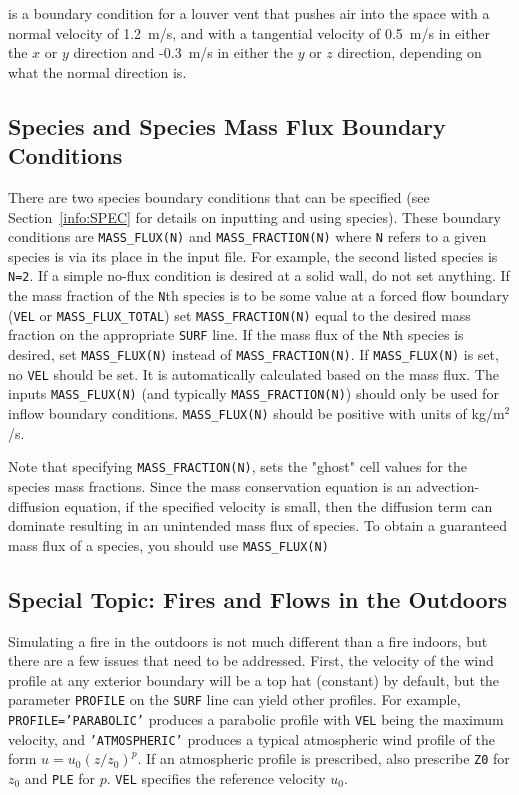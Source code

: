 \documentclass[11pt]{book}
\newcommand{\ct}{\tt\small}
\begin{document}
\noindent
is a boundary condition for a louver vent that pushes air into the
space with a normal velocity of 1.2~m/s, and with a tangential velocity
of 0.5~m/s in either the $x$ or $y$ direction and -0.3~m/s in either
the $y$ or $z$ direction, depending on what the normal direction is.

\subsection{Species and Species Mass Flux Boundary Conditions}

There are two species boundary conditions that can be specified
(see Section~\ref{info:SPEC} for details on inputting and using species).
These boundary conditions are {\ct MASS\_FLUX(N)} and {\ct MASS\_FRACTION(N)}
where {\ct N} refers to a given species is via its place in the
input file. For example, the second listed species is {\ct N=2}.
If a simple no-flux condition is desired at a solid wall, do not set
anything. If the mass fraction of the {\ct N}th species is to be some
value at a forced flow boundary ({\ct VEL} or {\ct MASS\_FLUX\_TOTAL}) set
{\ct MASS\_FRACTION(N)} equal to the desired mass fraction on the appropriate
{\ct SURF} line.
If the mass flux of the {\ct N}th species is desired, set
{\ct MASS\_FLUX(N)} instead of {\ct MASS\_FRACTION(N)}.
If {\ct MASS\_FLUX(N)}
is set, no {\ct VEL} should be set. It is automatically
calculated based on the mass flux.
The inputs {\ct MASS\_FLUX(N)} (and typically {\ct MASS\_FRACTION(N)}) should only be used
for inflow boundary conditions.  {\ct MASS\_FLUX(N)} should be positive with
units of kg/m$^2$/s.

\begin{warning}
\noindent
Note that specifying {\ct MASS\_FRACTION(N)}, sets the "ghost" cell values for the species
mass fractions.  Since the mass conservation equation is an advection-diffusion equation,
if the specified velocity is small, then the diffusion term can dominate resulting in an unintended
mass flux of species.  To obtain a guaranteed mass flux of a species, you should use {\ct MASS\_FLUX(N)}
\end{warning}


\subsection{Special Topic: Fires and Flows in the Outdoors}
Simulating a fire in the outdoors is not much different than a fire
indoors, but there are a few issues that need to be addressed.
First, the velocity of the wind profile at any exterior boundary will be a top hat (constant) by default,
but the parameter {\ct PROFILE} on the {\ct SURF} line
can yield other profiles.
For example, {\ct PROFILE='PARABOLIC'} produces a parabolic profile with
{\ct VEL} being the maximum velocity,
and {\ct 'ATMOSPHERIC'} produces a typical atmospheric wind
profile of the form $u=u_0 (z/z_0)^p$. If an atmospheric profile is
prescribed, also prescribe {\ct Z0} for $z_0$  and {\ct PLE} for $p$.
{\ct VEL} specifies the reference velocity $u_0$.
\end{document}
